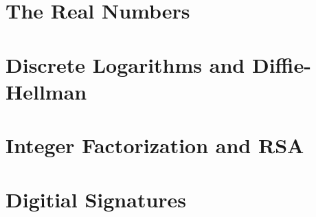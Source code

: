 \documentclass[12pt, oneside]{book}
\renewcommand{\theenumi}{\arabic{enumi}}
\renewcommand{\labelenumi}{\theenumi.}
\begin{document}














\chapter{The Real Numbers}\label{Real nums}
\vspace*{-0.25in}


\chapter{Discrete Logarithms and Diffie-Hellman}\label{discrete log}
\vspace*{-0.25in}


\chapter{Integer Factorization and RSA}\label{RSA}
\vspace*{-0.25in}


\chapter{Digitial Signatures}\label{dig sig}
\vspace*{-0.25in}


\renewcommand{\theenumi}{\alph{enumi}}
\renewcommand{\labelenumi}{(\theenumi)}


% 
\end{document}
